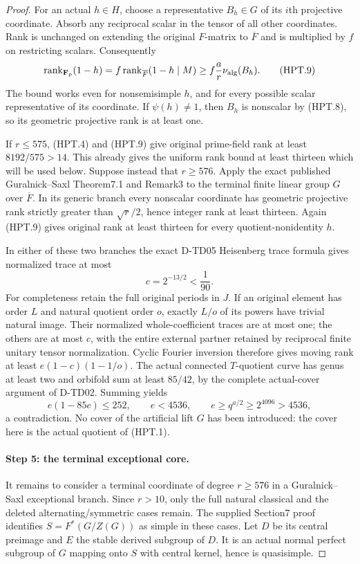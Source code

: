 \begin{proof}
For an actual $h\in H$, choose a representative $B_h\in G$
of its $i$th projective coordinate.  Absorb any reciprocal scalar
in the tensor of all other coordinates.  Rank is unchanged on
extending the original $F$-matrix to $\overline F$ and is
multiplied by $f$ on restricting scalars.  Consequently
\[
 \operatorname{rank}_{\mathbf F_p}(1-h)
   =f\operatorname{rank}_{\overline F}(1-h\mid M)
   \ge f\frac ar\nu_{\rm alg}(B_h).
 \tag{HPT.9}
\]
The bound works even for nonsemisimple $h$, and for every possible
scalar representative of its coordinate.  If $\psi(h)\ne1$,
then $B_h$ is nonscalar by (HPT.8), so its geometric projective
rank is at least one.

If $r\le575$, (HPT.4) and (HPT.9) give original prime-field
rank at least $8192/575>14$.  This already gives the uniform
rank bound at least thirteen which will be used below.
Suppose instead that $r\ge576$.  Apply the exact published
Guralnick--Saxl Theorem7.1 and Remark3 to the terminal finite
linear group $G$ over $\overline F$.\cite{BI:GS}
In its generic branch every nonscalar coordinate has geometric
projective rank strictly greater than $\sqrt r/2$, hence integer
rank at least thirteen.  Again (HPT.9) gives original rank at
least thirteen for every quotient-nonidentity $h$.

In either of these two branches the exact D-TD05 Heisenberg
trace formula gives normalized trace at most
\[
                    c=2^{-13/2}<\frac1{90}.
 \tag{HPT.10}
\]
For completeness retain the full original periods in $J$.
If an original element has order $L$ and natural quotient order
$o$, exactly $L/o$ of its powers have trivial natural image.
Their normalized whole-coefficient traces are at most one;
the others are at most $c$, with the entire external partner
retained by reciprocal finite unitary tensor normalization.
Cyclic Fourier inversion therefore gives moving rank at least
$e(1-c)(1-1/o)$.  The actual connected $T$-quotient curve has
genus at least two and orbifold sum at least $85/42$, by the
complete actual-cover argument of D-TD02.  Summing yields
\[
                 e(1-85c)\le252,
                 \qquad e<4536,
                 \qquad e\ge q^{a/2}\ge2^{4096}>4536,
 \tag{HPT.11}
\]
a contradiction.  No cover of the artificial lift $G$ has been
introduced: the cover here is the actual quotient of (HPT.1).

\paragraph{Step 5: the terminal exceptional core.}
It remains to consider a terminal coordinate of degree $r\ge576$
in a Guralnick--Saxl exceptional branch.  Since $r>10$, only
the full natural classical and the deleted alternating/symmetric
cases remain.  The supplied Section7 proof identifies
$S=F^*(G/Z(G))$ as simple in these cases.  Let $D$ be its central
preimage and $E$ the stable derived subgroup of $D$.
It is an actual normal perfect subgroup of $G$ mapping onto $S$
with central kernel, hence is quasisimple.


\end{proof}
